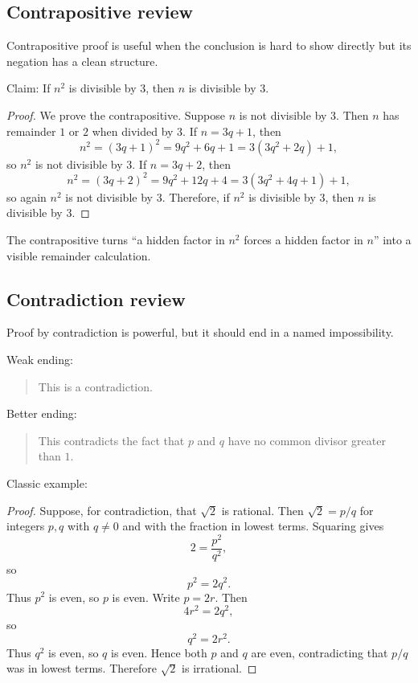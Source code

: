 \subsection{Contrapositive review}

Contrapositive proof is useful when the conclusion is hard to show directly but its negation has a clean structure.

Claim: If $n^2$ is divisible by $3$, then $n$ is divisible by $3$.

\begin{proof}
We prove the contrapositive. Suppose $n$ is not divisible by $3$. Then $n$ has remainder $1$ or $2$ when divided by $3$. If $n=3q+1$, then
\[
n^2=(3q+1)^2=9q^2+6q+1=3(3q^2+2q)+1,
\]
so $n^2$ is not divisible by $3$. If $n=3q+2$, then
\[
n^2=(3q+2)^2=9q^2+12q+4=3(3q^2+4q+1)+1,
\]
so again $n^2$ is not divisible by $3$. Therefore, if $n^2$ is divisible by $3$, then $n$ is divisible by $3$.
\end{proof}

\begin{intuitionbox}
The contrapositive turns ``a hidden factor in $n^2$ forces a hidden factor in $n$'' into a visible remainder calculation.
\end{intuitionbox}

\subsection{Contradiction review}

Proof by contradiction is powerful, but it should end in a named impossibility.

Weak ending:

\begin{quote}
This is a contradiction.
\end{quote}

Better ending:

\begin{quote}
This contradicts the fact that $p$ and $q$ have no common divisor greater than $1$.
\end{quote}

Classic example:

\begin{proof}
Suppose, for contradiction, that $\sqrt2$ is rational. Then $\sqrt2=p/q$ for integers $p,q$ with $q\neq0$ and with the fraction in lowest terms. Squaring gives
\[
2=\frac{p^2}{q^2},
\]
so
\[
p^2=2q^2.
\]
Thus $p^2$ is even, so $p$ is even. Write $p=2r$. Then
\[
4r^2=2q^2,
\]
so
\[
q^2=2r^2.
\]
Thus $q^2$ is even, so $q$ is even. Hence both $p$ and $q$ are even, contradicting that $p/q$ was in lowest terms. Therefore $\sqrt2$ is irrational.
\end{proof}

